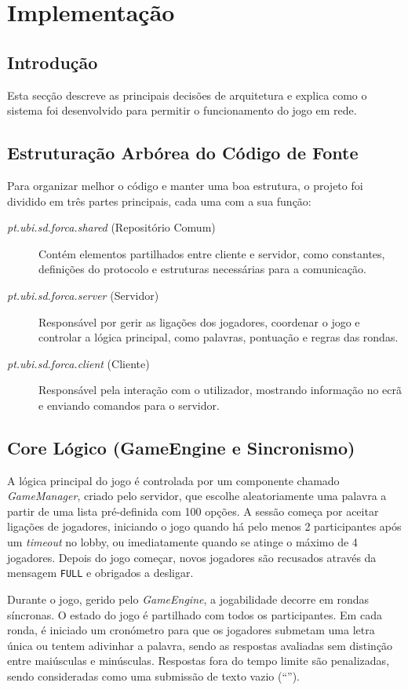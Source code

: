 \documentclass[11pt,a4paper,oneside]{report}
\begin{document}
\chapter{Implementação}

\section{Introdução}
Esta secção descreve as principais decisões de arquitetura e explica como o sistema foi desenvolvido para permitir o funcionamento do jogo em rede.

\section{Estruturação Arbórea do Código de Fonte}
Para organizar melhor o código e manter uma boa estrutura, o projeto foi dividido em três partes principais, cada uma com a sua função:
\begin{description}
    \item[\textit{pt.ubi.sd.forca.shared} (Repositório Comum)] Contém elementos partilhados entre cliente e servidor, como constantes, definições do protocolo e estruturas necessárias para a comunicação.
    \item[\textit{pt.ubi.sd.forca.server} (Servidor)] Responsável por gerir as ligações dos jogadores, coordenar o jogo e controlar a lógica principal, como palavras, pontuação e regras das rondas.
    \item[\textit{pt.ubi.sd.forca.client} (Cliente)] Responsável pela interação com o utilizador, mostrando informação no ecrã e enviando comandos para o servidor.
\end{description}

\section{Core Lógico (GameEngine e Sincronismo)}
A lógica principal do jogo é controlada por um componente chamado \textit{GameManager}, criado pelo servidor, que escolhe aleatoriamente uma palavra a partir de uma lista pré-definida com 100 opções. 
A sessão começa por aceitar ligações de jogadores, iniciando o jogo quando há pelo menos 2 participantes após um \textit{timeout} no lobby, ou imediatamente quando se atinge o máximo de 4 jogadores. Depois do jogo começar, novos jogadores são recusados através da mensagem \texttt{FULL} e obrigados a desligar.

Durante o jogo, gerido pelo \textit{GameEngine}, a jogabilidade decorre em rondas síncronas. O estado do jogo é partilhado com todos os participantes. Em cada ronda, é iniciado um cronómetro para que os jogadores submetam uma letra única ou tentem adivinhar a palavra, sendo as respostas avaliadas sem distinção entre maiúsculas e minúsculas. Respostas fora do tempo limite são penalizadas, sendo consideradas como uma submissão de texto vazio (``'').
\end{document}
